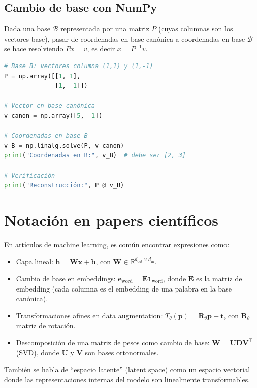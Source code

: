 \documentclass[12pt,a4paper,openany,oneside]{book}
\begin{document}
\subsection{Cambio de base con NumPy}
Dada una base $\mathcal{B}$ representada por una matriz $P$ (cuyas columnas son los vectores base), pasar de coordenadas en base canónica a coordenadas en base $\mathcal{B}$ se hace resolviendo $P x = v$, es decir $x = P^{-1} v$.

\begin{lstlisting}[language=Python]
# Base B: vectores columna (1,1) y (1,-1)
P = np.array([[1, 1],
              [1, -1]])

# Vector en base canónica
v_canon = np.array([5, -1])

# Coordenadas en base B
v_B = np.linalg.solve(P, v_canon)
print("Coordenadas en B:", v_B)  # debe ser [2, 3]

# Verificación
print("Reconstrucción:", P @ v_B)
\end{lstlisting}

\section{Notación en papers científicos}

En artículos de machine learning, es común encontrar expresiones como:

\begin{itemize}
    \item Capa lineal: $\mathbf{h} = \mathbf{W}\mathbf{x} + \mathbf{b}$, con $\mathbf{W} \in \mathbb{R}^{d_{\text{out}} \times d_{\text{in}}}$.
    \item Cambio de base en embeddings: $\mathbf{e}_{\text{word}} = \mathbf{E} \mathbf{1}_{\text{word}}$, donde $\mathbf{E}$ es la matriz de embedding (cada columna es el embedding de una palabra en la base canónica).
    \item Transformaciones afines en data augmentation: $T_{\theta}(\mathbf{p}) = \mathbf{R}_{\theta} \mathbf{p} + \mathbf{t}$, con $\mathbf{R}_{\theta}$ matriz de rotación.
    \item Descomposición de una matriz de pesos como cambio de base: $\mathbf{W} = \mathbf{U} \mathbf{D} \mathbf{V}^\top$ (SVD), donde $\mathbf{U}$ y $\mathbf{V}$ son bases ortonormales.
\end{itemize}

También se habla de ``espacio latente'' (latent space) como un espacio vectorial donde las representaciones internas del modelo son linealmente transformables.
\end{document}
